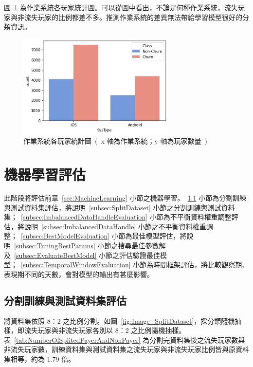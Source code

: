 圖~\ref{fig:eva_ValuableFeature_SystemType} 為作業系統各玩家統計圖。可以從圖中看出，不論是何種作業系統，流失玩家與非流失玩家的比例都差不多。推測作業系統的差異無法帶給學習模型很好的分類資訊。

\begin{figure}[!htb]
    \begin{center}
      \includegraphics[width=0.7\textwidth]{figures/evaluation/Image_SystemType.png}
      \caption[作業系統各玩家統計圖]{作業系統各玩家統計圖\ (\ x 軸為作業系統；y 軸為玩家數量\ )\ }
      \label{fig:eva_ValuableFeature_SystemType}
    \end{center}
\end{figure}

\section{機器學習評估}
\label{sec:MachineLearningEvaluation}

此階段將評估前章~\ref{sec:MachineLearning} 小節之機器學習。~\ref{subsec:SplitDatasetEvaluation} 小節為分割訓練與測試資料集評估，將說明~\ref{subsec:SplitDataset} 小節之分割訓練與測試資料集；~\ref{subsec:ImbalancedDataHandleEvaluation} 小節為不平衡資料權重調整評估，將說明~\ref{subsec:ImbalancedDataHandle} 小節之不平衡資料權重調整；~\ref{subsec:BestModelEvaluation} 小節為最佳模型評估，將說明~\ref{subsec:TuningBestParams} 小節之搜尋最佳參數解及~\ref{subsec:EvaluateBestModel} 小節之評估驗證最佳模型；~\ref{subsec:TemporalWindowEvaluation} 小節為時間框架評估，將比較觀察期、表現期不同的天數，會對模型的輸出有甚麼影響。

\subsection{分割訓練與測試資料集評估}
\label{subsec:SplitDatasetEvaluation}

將資料集依照 8：2 之比例分割。如圖~\ref{fig:Image_SplitDataset}，採分類隨機抽樣，即流失玩家與非流失玩家各別以 8：2 之比例隨機抽樣。表~\ref{tab:NumberOfSplitedPayerAndNonPayer} 為分割完資料集後之流失玩家數與非流失玩家數，訓練資料集與測試資料集之流失玩家與非流失玩家比例皆與原資料集相等，約為 1.79 倍。

